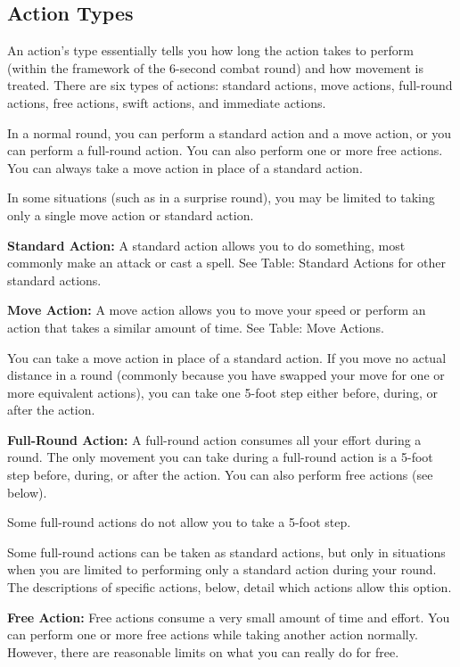 \subsection{Action Types}
An action's type essentially tells you how long the action takes to perform (within the framework of the 6-second combat round) and how movement is treated. There are six types of actions: standard actions, move actions, full-round actions, free actions, swift actions, and immediate actions.

In a normal round, you can perform a standard action and a move action, or you can perform a full-round action. You can also perform one or more free actions. You can always take a move action in place of a standard action.

In some situations (such as in a surprise round), you may be limited to taking only a single move action or standard action.

\textbf{Standard Action:} A standard action allows you to do something, most commonly make an attack or cast a spell. See Table: Standard Actions for other standard actions.

\textbf{Move Action:} A move action allows you to move your speed or perform an action that takes a similar amount of time. See Table: Move Actions.

You can take a move action in place of a standard action. If you move no actual distance in a round (commonly because you have swapped your move for one or more equivalent actions), you can take one 5-foot step either before, during, or after the action.

\textbf{Full-Round Action:} A full-round action consumes all your effort during a round. The only movement you can take during a full-round action is a 5-foot step before, during, or after the action. You can also perform free actions (see below).

Some full-round actions do not allow you to take a 5-foot step.

Some full-round actions can be taken as standard actions, but only in situations when you are limited to performing only a standard action during your round. The descriptions of specific actions, below, detail which actions allow this option.

\textbf{Free Action:} Free actions consume a very small amount of time and effort. You can perform one or more free actions while taking another action normally. However, there are reasonable limits on what you can really do for free.

